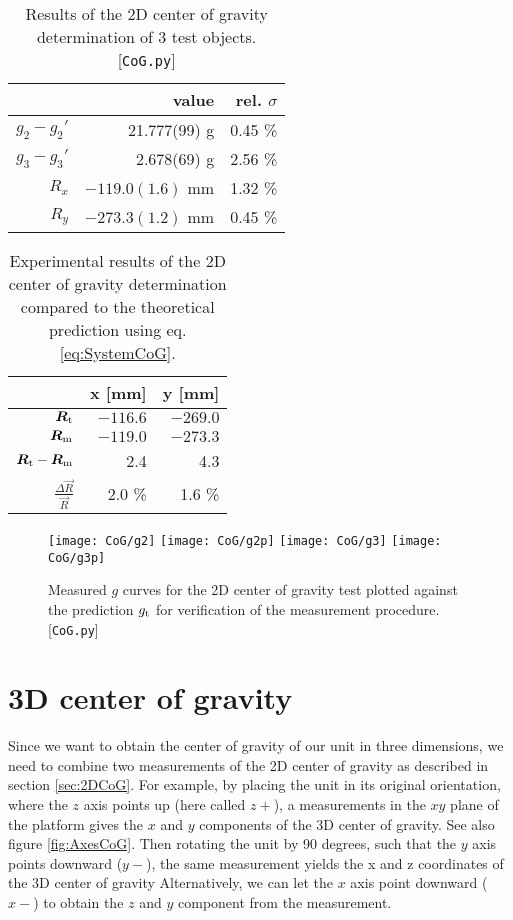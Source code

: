 \documentclass[journal]{IEEEtran}
\begin{document}
\begin{table}
	\centering
	\begin{tabular}{r | r r}
		& value & rel. $\sigma$ \\
		\hline
		$g_2 - g_2'$	&	21.777(99) g & 0.45 \% \\
		$g_3 - g_3'$	&	2.678(69) g & 2.56 \% \\
		$R_x$	&	$-119.0(1.6)$ mm & 1.32 \% \\
		$R_y$	&	$-273.3(1.2)$ mm & 0.45 \% \\
	\end{tabular}
\caption{Results of the 2D center of gravity determination of 3 test objects. [\texttt{CoG.py}]}
	\label{tab:3MassValues}
\end{table}

\begin{table}[t]
	\centering
	\begin{tabular}{r | r r}
		& x [mm] & y [mm] \\
		\hline
		$\vec{R}_{\textup{t}}$	&	$-116.6$	& $-269.0$ \\
		$\vec{R}_{\textup{m}}$	&	$-119.0$	& $-273.3$ \\
		$\vec{R}_{\textup{t}} - \vec{R}_{\textup{m}}$			&	2.4		& 4.3	\\
		$\frac{\Delta \vec{R}}{\vec{R}}$ &	2.0	\%	& 1.6 \% \\
	\end{tabular}
	\caption{Experimental results of the 2D center of gravity determination compared to the theoretical prediction using eq. \eqref{eq:SystemCoG}.}
	\label{tab:3MassResults}
\end{table}

\begin{figure}
	\centering
	\texttt{[image: CoG/g2]}
	\texttt{[image: CoG/g2p]}
	\texttt{[image: CoG/g3]}
	\texttt{[image: CoG/g3p]}
	\caption{Measured $g$ curves for the 2D center of gravity test plotted against the prediction $g_{\textup{t}}$ for verification of the measurement procedure. [\texttt{CoG.py}]}
	\label{fig:3MassGTest}
\end{figure}

\section{3D center of gravity}

Since we want to obtain the center of gravity of our unit in three dimensions, we need to combine two measurements of the 2D center of gravity as described in section \ref{sec:2DCoG}.
For example, by placing the unit in its original orientation, where the $z$ axis points up (here called $z+$), a measurements in the $xy$ plane of the platform gives the $x$ and $y$ components of the 3D center of gravity. See also figure \ref{fig:AxesCoG}.
Then rotating the unit by 90 degrees, such that the $y$ axis points downward ($y-$), the same measurement yields the x and z coordinates of the 3D center of gravity
Alternatively, we can let the $x$ axis point downward ($x-$) to obtain the $z$ and $y$ component from the measurement.
\end{document}
